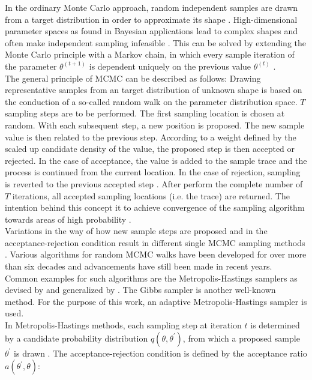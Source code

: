         In the ordinary Monte Carlo approach, random independent samples are drawn from a target distribution in order to approximate its shape \citep{gilks2005markov, delaVarga2016}. High-dimensional parameter spaces as found in Bayesian applications lead to complex shapes and often make independent sampling infeasible \citep{gilks2005markov}. This can be solved by extending the Monte Carlo principle with a Markov chain, in which every sample iteration of the parameter $\theta^{(t+1)}$ is dependent uniquely on the previous value $\theta^{(t)}$ \citep{gilks2005markov, delaVarga2016}.\\
        The general principle of MCMC can be described as follows: 
        Drawing representative samples from an target distribution of unknown shape is based on the conduction of a so-called random walk on the parameter distribution space. $T$ sampling steps are to be performed. The first sampling location is chosen at random. With each subsequent step, a new position is proposed. The new sample value is then related to the previous step. According to a weight defined by the scaled up candidate density of the value, the proposed step is then accepted or rejected. In the case of acceptance, the value is added to the sample trace and the process is continued from the current location. In the case of rejection, sampling is reverted to the previous accepted step \citep{schaaf2017, delaVarga2016}. After perform the complete number of $T$ iterations, all accepted sampling locations (i.e. the trace) are returned. The intention behind this concept it to achieve convergence of the sampling algorithm towards areas of high probability \citep{davidson2015}.\\ 
        Variations in the way of how new  sample steps are proposed and in the acceptance-rejection condition result in different single MCMC sampling methods \citep{schaaf2017, delaVarga2016}. Various algorithms for random MCMC walks have been developed for over more than six decades and advancements have still been made in recent years. Common examples for such algorithms are the Metropolis-Hastings samplers as devised by \citet{metropolis1953equation} and generalized by \citet{hastings1970}. The Gibbs sampler \citep{geman1984stochastic} is another well-known method. 
        For the purpose of this work, an adaptive Metropolis-Hastings sampler is used.\\
        In Metropolis-Hastings methods, each sampling step at iteration $t$ is determined by a candidate probability distribution $q(\theta,\theta^{'})$, from which a proposed sample $\theta^{'}$ is drawn \citep{delaVarga2016}. The acceptance-rejection condition is defined by the acceptance ratio $a(\theta^{'},\theta)$:
        
